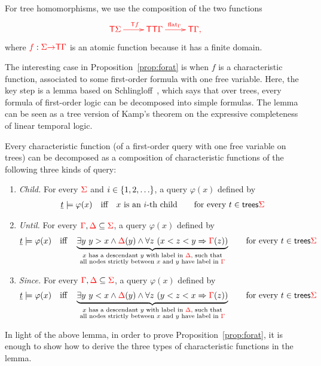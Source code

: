 For tree homomorphisms, we use the composition of the two functions
\begin{align*}
    \ranked{
    \xymatrix{
        \tmonad \rSigma \ar[r]^{\tmonad \ranked f} & \tmonad \tmonad \rGamma \ar[r]^{\flatt_\rGamma} & \tmonad \rGamma,
    }}
\end{align*}
where ${\color{red}{f}} : {\color{red}{\Sigma}} {\color{red}{\to}} {\color{red}{\mathsf T}} {\color{red}{\Gamma}}$ is an atomic function because it has a finite domain.  

The interesting case in Proposition~\ref{prop:forat} is when $f$ is a characteristic function, associated to some first-order formula with one free variable. Here, the key step is a lemma based on Schlingloff~\cite[Theorem 2.6]{schlingloff1992expressive}, which says that  over trees, every formula of first-order logic can be decomposed into simple formulas.  The lemma can be seen as a tree version of Kamp's theorem on the expressive completeness of linear temporal logic.


\begin{lemma}\label{lem:schlingloff} Every characteristic function (of a first-order query with one free variable on trees) can be decomposed as a composition of characteristic functions of the following three kinds of  query:
    \begin{enumerate}
        \item \emph{Child.} For every ${\color{red}{\Sigma}}$ and  $i \in \{1,2,\ldots\}$, a query $\varphi(x)$ defined by
        \begin{align*}
            \underline t \models \varphi(x) \quad \text{iff} \quad \text{$x$ is an $i$-th child}\qquad \text{for every $t \in \mathsf {trees} {\color{red}{\Sigma}}$}
        \end{align*}
         \item \emph{Until.} For every ${\color{red}{\Gamma}}, {\color{red}{\Delta}} \subseteq {\color{red}{\Sigma}}$, a query $\varphi(x)$ defined by
         \begin{align*}
             \underline t \models \varphi(x) \quad \text{iff} \quad \underbrace{\exists y\ y > x \land {\color{red}{\Delta}}(y) \land  \forall z \ (x < z < y \Rightarrow {\color{red}{\Gamma}}(z))}_{\substack{\text{$x$ has a descendant $y$ with label in ${\color{red}{\Delta}}$, such that}\\ \text{all nodes strictly between $x$ and $y$ have label in ${\color{red}{\Gamma}}$}}}  \qquad \text{for every $t \in  \mathsf {trees} {\color{red}{\Sigma}}$}
         \end{align*} 
         \item \emph{Since.} For every ${\color{red}{\Gamma}}, {\color{red}{\Delta}} \subseteq {\color{red}{\Sigma}}$,  a query $\varphi(x)$ defined by
         \begin{align*}
             \underline t \models \varphi(x) \quad \text{iff} \quad \underbrace{\exists y\ y < x \land {\color{red}{\Delta}}(y) \land  \forall z \ (y < z < x \Rightarrow {\color{red}{\Gamma}}(z))}_{\substack{\text{$x$ has a descendant $y$ with label in ${\color{red}{\Delta}}$, such that}\\ \text{all nodes strictly between $x$ and $y$ have label in ${\color{red}{\Gamma}}$}}}  \qquad \text{for every $t \in  \mathsf {trees} {\color{red}{\Sigma}}$}
         \end{align*} 
    \end{enumerate}
\end{lemma}

In light of the above lemma, in order to prove Proposition~\ref{prop:forat}, it is enough to show how to derive the three types of characteristic functions in the lemma. 